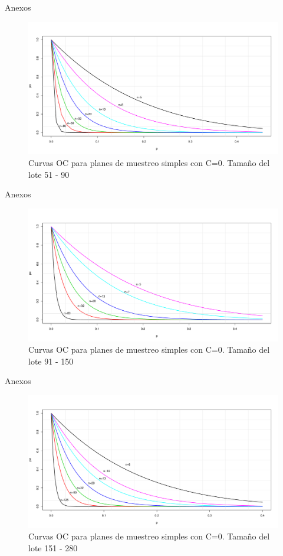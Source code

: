 \documentclass[10pt]{beamer}
\begin{document}
\begin{frame}{Anexos}
\begin{figure}[h!]
  \centering
  \includegraphics[scale=0.33]{FigurasUV/CO5.pdf}
  \caption{Curvas OC para planes de muestreo simples con C=0. Tamaño del lote 51 - 90}
\end{figure}
\end{frame}

\begin{frame}{Anexos}
\begin{figure}[h!]
  \centering
  \includegraphics[scale=0.33]{FigurasUV/CO6.pdf}
  \caption{Curvas OC para planes de muestreo simples con C=0. Tamaño del lote 91 - 150}
\end{figure}
\end{frame}

\begin{frame}{Anexos}
\begin{figure}[h!]
  \centering
  \includegraphics[scale=0.33]{FigurasUV/CO7.pdf}
  \caption{Curvas OC para planes de muestreo simples con C=0. Tamaño del lote 151 - 280}
\end{figure}
\end{frame}
\end{document}
